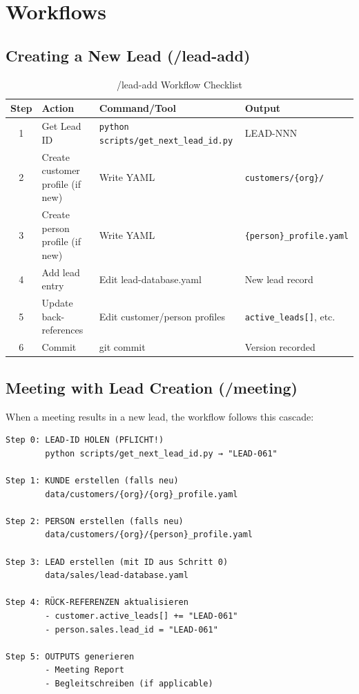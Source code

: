 \section{Workflows}
\label{sec:bn-workflows}

\subsection{Creating a New Lead (/lead-add)}
\label{sec:bn-lead-add}

\begin{table}[htbp]
\centering
\caption{/lead-add Workflow Checklist}
\label{tab:bn-lead-add}
\renewcommand{\arraystretch}{1.3}
\begin{tabular}{@{}clll@{}}
\toprule
\textbf{Step} & \textbf{Action} & \textbf{Command/Tool} & \textbf{Output} \\
\midrule
1 & Get Lead ID & \texttt{python scripts/get\_next\_lead\_id.py} & LEAD-NNN \\
2 & Create customer profile (if new) & Write YAML & \texttt{customers/\{org\}/} \\
3 & Create person profile (if new) & Write YAML & \texttt{\{person\}\_profile.yaml} \\
4 & Add lead entry & Edit lead-database.yaml & New lead record \\
5 & Update back-references & Edit customer/person profiles & \texttt{active\_leads[]}, etc. \\
6 & Commit & git commit & Version recorded \\
\bottomrule
\end{tabular}
\end{table}

\subsection{Meeting with Lead Creation (/meeting)}

When a meeting results in a new lead, the workflow follows this cascade:

\begin{verbatim}
Step 0: LEAD-ID HOLEN (PFLICHT!)
        python scripts/get_next_lead_id.py → "LEAD-061"

Step 1: KUNDE erstellen (falls neu)
        data/customers/{org}/{org}_profile.yaml

Step 2: PERSON erstellen (falls neu)
        data/customers/{org}/{person}_profile.yaml

Step 3: LEAD erstellen (mit ID aus Schritt 0)
        data/sales/lead-database.yaml

Step 4: RÜCK-REFERENZEN aktualisieren
        - customer.active_leads[] += "LEAD-061"
        - person.sales.lead_id = "LEAD-061"

Step 5: OUTPUTS generieren
        - Meeting Report
        - Begleitschreiben (if applicable)
\end{verbatim}

